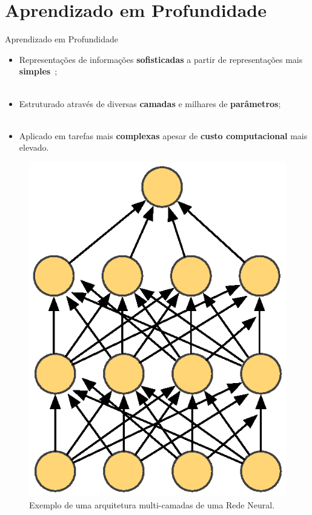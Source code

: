 \section{Aprendizado em Profundidade}
\label{s.deep_learning}

\begin{frame}{Aprendizado em Profundidade}
	\begin{itemize}
		\justifying
		\item Representações de informações \textbf{sofisticadas} a partir de representações mais \textbf{simples}~\cite{Hinton:86};
		\\~\\
		\item Estruturado através de diversas \textbf{camadas} e milhares de \textbf{parâmetros};
		\\~\\
		\item Aplicado em tarefas mais \textbf{complexas} apesar de \textbf{custo computacional} mais elevado.
	\end{itemize}
\end{frame}

\begin{frame}
	\begin{figure}
		\centering
		\includegraphics[scale=0.625,angle=270]{figs/nn.eps}	
		\caption{Exemplo de uma arquitetura multi-camadas de uma Rede Neural.}
		\label{f.nn}
	\end{figure}
\end{frame}

